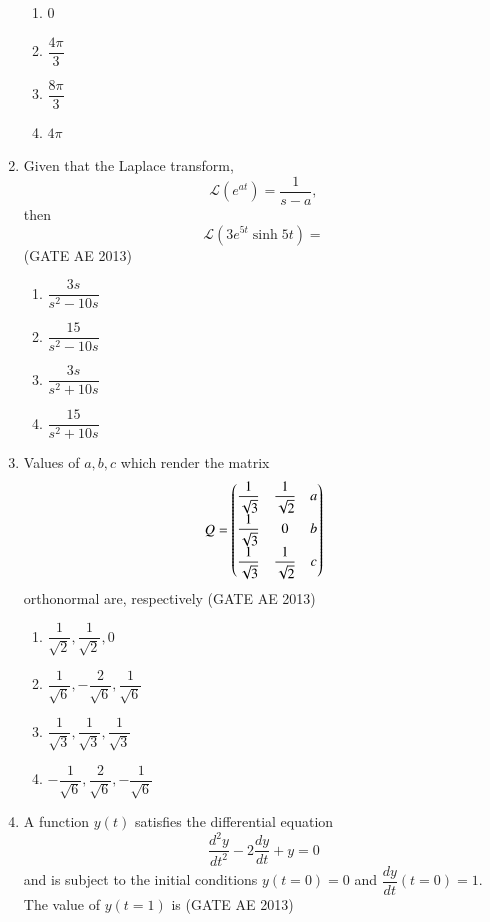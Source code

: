 \documentclass[journal,12pt,onecolumn]{IEEEtran}
\theoremstyle{remark}
\begin{document}
\begin{flushleft}
\begin{enumerate}
\begin{multicols}{2}
\begin{enumerate}
    \item $0$  
    \item $\dfrac{4\pi}{3}$  
    \item $\dfrac{8\pi}{3}$  
    \item $4\pi$  
\end{enumerate}
\end{multicols}

\item Given that the Laplace transform, 
\[
\mathcal{L}(e^{at}) = \frac{1}{s-a},
\] 
then 
\[
\mathcal{L}(3e^{5t} \sinh 5t) =
\]
\hfill(GATE AE 2013)

\begin{multicols}{2}
\begin{enumerate}
    \item $\dfrac{3s}{s^2 - 10s}$  
    \item $\dfrac{15}{s^2 - 10s}$  
    \item $\dfrac{3s}{s^2 + 10s}$  
    \item $\dfrac{15}{s^2 + 10s}$  
\end{enumerate}
\end{multicols}

\item Values of $a, b, c$ which render the matrix
\[
Q = \begin{pmatrix} \dfrac{1}{\sqrt{3}} & \dfrac{1}{\sqrt{2}} & a \\[6pt]
           \dfrac{1}{\sqrt{3}} & 0 & b \\[6pt]
           \dfrac{1}{\sqrt{3}} & \dfrac{1}{\sqrt{2}} & c \end{pmatrix}
\]
orthonormal are, respectively
\hfill(GATE AE 2013)

\begin{multicols}{2}
\begin{enumerate}
    \item $\dfrac{1}{\sqrt{2}}, \dfrac{1}{\sqrt{2}}, 0$  
    \item $\dfrac{1}{\sqrt{6}}, -\dfrac{2}{\sqrt{6}}, \dfrac{1}{\sqrt{6}}$  
    \item $\dfrac{1}{\sqrt{3}}, \dfrac{1}{\sqrt{3}}, \dfrac{1}{\sqrt{3}}$  
    \item $-\dfrac{1}{\sqrt{6}}, \dfrac{2}{\sqrt{6}}, -\dfrac{1}{\sqrt{6}}$  
\end{enumerate}
\end{multicols}

\item A function $y(t)$ satisfies the differential equation
\[
\frac{d^2 y}{dt^2} - 2\frac{dy}{dt} + y = 0
\]
and is subject to the initial conditions $y(t=0) = 0$ and $\dfrac{dy}{dt}(t=0) = 1$.  
The value of $y(t=1)$ is \underline{\hspace{3cm}}
\hfill(GATE AE 2013)


\end{enumerate}
\end{flushleft}
\end{document}
